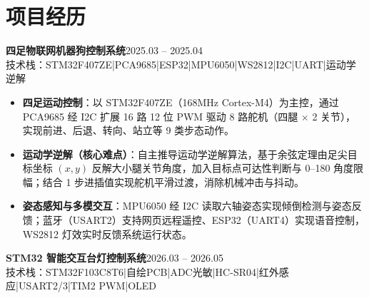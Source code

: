 \documentclass[10pt,a4paper]{article}
\newcommand{\projectblock}[3]{%
    {\bfseries\color{darktext}#1}\hfill{\color{graytext}#2}\\%
    {\small\color{graytext}#3}%
    \vspace{0.15em}%
}
\begin{document}
\vspace{0.2em}

\section{\faProjectDiagram\hspace{0.4em}项目经历}

\projectblock{四足物联网机器狗控制系统}{2025.03 -- 2025.04}{技术栈：STM32F407ZE\hspace{0.3em}|\hspace{0.3em}PCA9685\hspace{0.3em}|\hspace{0.3em}ESP32\hspace{0.3em}|\hspace{0.3em}MPU6050\hspace{0.3em}|\hspace{0.3em}WS2812\hspace{0.3em}|\hspace{0.3em}I2C\hspace{0.3em}|\hspace{0.3em}UART\hspace{0.3em}|\hspace{0.3em}运动学逆解}

\begin{itemize}[leftmargin=1.5em, itemsep=1pt, parsep=0pt, topsep=2pt]
    \item \textbf{四足运动控制}：以 STM32F407ZE（168MHz Cortex-M4）为主控，通过 PCA9685 经 I2C 扩展 16 路 12 位 PWM 驱动 8 路舵机（四腿 $\times$ 2 关节），实现前进、后退、转向、站立等 9 类步态动作。
    \item \textbf{运动学逆解（核心难点）}：自主推导运动学逆解算法，基于余弦定理由足尖目标坐标 $(x, y)$ 反解大小腿关节角度，加入目标点可达性判断与 0\textdegree--180\textdegree{} 角度限幅；结合 1\textdegree{} 步进插值实现舵机平滑过渡，消除机械冲击与抖动。
    \item \textbf{姿态感知与多模交互}：MPU6050 经 I2C 读取六轴姿态实现倾倒检测与姿态反馈；蓝牙（USART2）支持网页远程遥控、ESP32（UART4）实现语音控制，WS2812 灯效实时反馈系统运行状态。
\end{itemize}

\vspace{0.15em}

\projectblock{STM32 智能交互台灯控制系统}{2026.03 -- 2026.05}{技术栈：STM32F103C8T6\hspace{0.3em}|\hspace{0.3em}自绘PCB\hspace{0.3em}|\hspace{0.3em}ADC光敏\hspace{0.3em}|\hspace{0.3em}HC-SR04\hspace{0.3em}|\hspace{0.3em}红外感应\hspace{0.3em}|\hspace{0.3em}USART2/3\hspace{0.3em}|\hspace{0.3em}TIM2 PWM\hspace{0.3em}|\hspace{0.3em}OLED}
\end{document}
